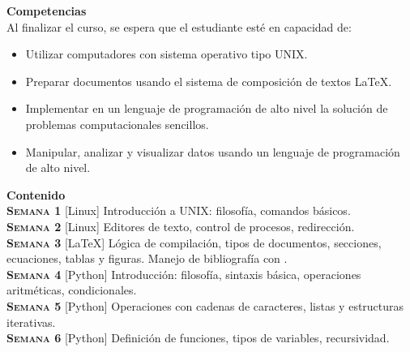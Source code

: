 \documentclass[letterpaper,10pt,onecolumn]{article}
\begin{document}
\noindent\textbf{\large {} \quad Competencias}\\[-0.2cm]

\noindent\normalsize Al finalizar el curso, se espera que el estudiante esté en capacidad de:

\begin{itemize}
	\item Utilizar computadores con sistema operativo tipo UNIX.\\[-0.6cm]
	\item Preparar documentos usando el sistema de composición de textos \LaTeX.\\[-0.6cm]
	\item Implementar en un lenguaje de programación de alto nivel la solución de problemas computacionales sencillos.\\[-0.6cm]
	\item Manipular, analizar y visualizar datos usando un lenguaje de programación de alto nivel.\\[-0.2cm]
\end{itemize}

\noindent\textbf{\large {} \quad Contenido}\\[-0.2cm]

\noindent\normalsize \textbf{\textsc{Semana 1}} [Linux]
Introducción a UNIX: filosofía, comandos básicos.
\\[-0.3cm] 

\noindent\textbf{\textsc{Semana 2}}  [Linux] Editores de texto,
control de procesos, redirección. \\[-0.3cm]  

\noindent\textbf{\textsc{Semana 3}} [\LaTeX] Lógica de
compilación, tipos de documentos, secciones, ecuaciones, tablas y
figuras. Manejo de bibliografía con \BibTeX.\\[-0.3cm]   

\noindent\textbf{\textsc{Semana 4}} [Python] Introducción: filosofía,
sintaxis básica, operaciones aritméticas, condicionales.\\[-0.3cm]   

\noindent\textbf{\textsc{Semana 5}} [Python] Operaciones con cadenas de
caracteres, listas y estructuras iterativas.\\[-0.3cm] 

\noindent\textbf{\textsc{Semana 6}} [Python] Definición de funciones,
tipos de variables, recursividad. \\[-0.3cm] 
\end{document}
